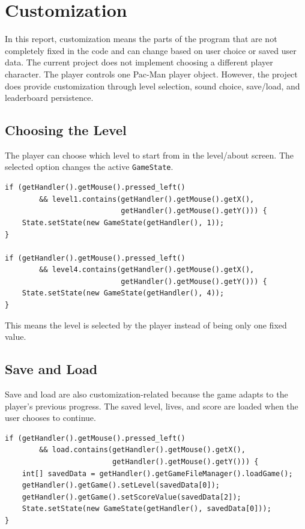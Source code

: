 \documentclass[12pt,a4paper]{article}
\begin{document}
\section{Customization}

In this report, customization means the parts of the program that are not completely fixed in the code and can change based on user choice or saved user data. The current project does not implement choosing a different player character. The player controls one Pac-Man player object. However, the project does provide customization through level selection, sound choice, save/load, and leaderboard persistence.

\subsection{Choosing the Level}

The player can choose which level to start from in the level/about screen. The selected option changes the active \texttt{GameState}.

\begin{lstlisting}
if (getHandler().getMouse().pressed_left()
        && level1.contains(getHandler().getMouse().getX(),
                           getHandler().getMouse().getY())) {
    State.setState(new GameState(getHandler(), 1));
}

if (getHandler().getMouse().pressed_left()
        && level4.contains(getHandler().getMouse().getX(),
                           getHandler().getMouse().getY())) {
    State.setState(new GameState(getHandler(), 4));
}
\end{lstlisting}

This means the level is selected by the player instead of being only one fixed value.

\subsection{Save and Load}

Save and load are also customization-related because the game adapts to the player's previous progress. The saved level, lives, and score are loaded when the user chooses to continue.

\begin{lstlisting}
if (getHandler().getMouse().pressed_left()
        && load.contains(getHandler().getMouse().getX(),
                         getHandler().getMouse().getY())) {
    int[] savedData = getHandler().getGameFileManager().loadGame();
    getHandler().getGame().setLevel(savedData[0]);
    getHandler().getGame().setScoreValue(savedData[2]);
    State.setState(new GameState(getHandler(), savedData[0]));
}
\end{lstlisting}
\end{document}

